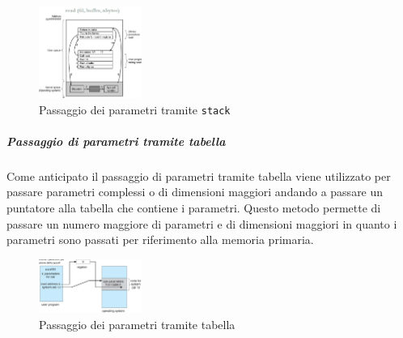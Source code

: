                     \begin{figure}[H]
                        \centering
                        \includegraphics[width=0.3\textwidth]{images/02/stackCall.png}
                        \caption{Passaggio dei parametri tramite \texttt{stack}}
                    \end{figure}
                \subparagraph{Passaggio di parametri tramite tabella} 
                    Come anticipato il passaggio di parametri tramite tabella viene utilizzato per passare parametri complessi o di dimensioni maggiori andando a passare un puntatore alla tabella che contiene i parametri. Questo metodo permette di passare un numero maggiore di parametri e di dimensioni maggiori in quanto i parametri sono passati per riferimento alla memoria primaria.
                    \begin{figure}[H]
                        \centering
                        \includegraphics[width=0.3\textwidth]{images/02/tabCall.png}
                        \caption{Passaggio dei parametri tramite tabella}
                    \end{figure}
                    